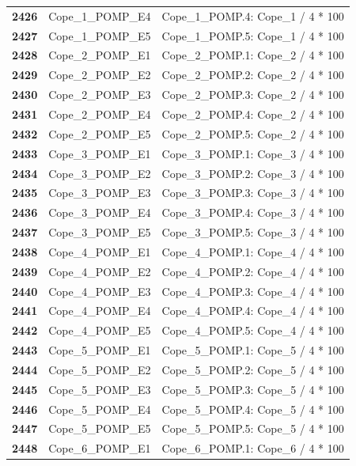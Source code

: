 \documentclass[
  letterpaper,
  DIV=11,
  numbers=noendperiod]{scrartcl}
\begin{document}
\begin{longtable}[t]{>{}cll}
\addlinespace
\textbf{2426} & Cope\_1\_POMP\_E4 & Cope\_1\_POMP.4: Cope\_1 / 4 * 100\\
\textbf{2427} & Cope\_1\_POMP\_E5 & Cope\_1\_POMP.5: Cope\_1 / 4 * 100\\
\textbf{2428} & Cope\_2\_POMP\_E1 & Cope\_2\_POMP.1: Cope\_2 / 4 * 100\\
\textbf{2429} & Cope\_2\_POMP\_E2 & Cope\_2\_POMP.2: Cope\_2 / 4 * 100\\
\textbf{2430} & Cope\_2\_POMP\_E3 & Cope\_2\_POMP.3: Cope\_2 / 4 * 100\\
\addlinespace
\textbf{2431} & Cope\_2\_POMP\_E4 & Cope\_2\_POMP.4: Cope\_2 / 4 * 100\\
\textbf{2432} & Cope\_2\_POMP\_E5 & Cope\_2\_POMP.5: Cope\_2 / 4 * 100\\
\textbf{2433} & Cope\_3\_POMP\_E1 & Cope\_3\_POMP.1: Cope\_3 / 4 * 100\\
\textbf{2434} & Cope\_3\_POMP\_E2 & Cope\_3\_POMP.2: Cope\_3 / 4 * 100\\
\textbf{2435} & Cope\_3\_POMP\_E3 & Cope\_3\_POMP.3: Cope\_3 / 4 * 100\\
\addlinespace
\textbf{2436} & Cope\_3\_POMP\_E4 & Cope\_3\_POMP.4: Cope\_3 / 4 * 100\\
\textbf{2437} & Cope\_3\_POMP\_E5 & Cope\_3\_POMP.5: Cope\_3 / 4 * 100\\
\textbf{2438} & Cope\_4\_POMP\_E1 & Cope\_4\_POMP.1: Cope\_4 / 4 * 100\\
\textbf{2439} & Cope\_4\_POMP\_E2 & Cope\_4\_POMP.2: Cope\_4 / 4 * 100\\
\textbf{2440} & Cope\_4\_POMP\_E3 & Cope\_4\_POMP.3: Cope\_4 / 4 * 100\\
\addlinespace
\textbf{2441} & Cope\_4\_POMP\_E4 & Cope\_4\_POMP.4: Cope\_4 / 4 * 100\\
\textbf{2442} & Cope\_4\_POMP\_E5 & Cope\_4\_POMP.5: Cope\_4 / 4 * 100\\
\textbf{2443} & Cope\_5\_POMP\_E1 & Cope\_5\_POMP.1: Cope\_5 / 4 * 100\\
\textbf{2444} & Cope\_5\_POMP\_E2 & Cope\_5\_POMP.2: Cope\_5 / 4 * 100\\
\textbf{2445} & Cope\_5\_POMP\_E3 & Cope\_5\_POMP.3: Cope\_5 / 4 * 100\\
\addlinespace
\textbf{2446} & Cope\_5\_POMP\_E4 & Cope\_5\_POMP.4: Cope\_5 / 4 * 100\\
\textbf{2447} & Cope\_5\_POMP\_E5 & Cope\_5\_POMP.5: Cope\_5 / 4 * 100\\
\textbf{2448} & Cope\_6\_POMP\_E1 & Cope\_6\_POMP.1: Cope\_6 / 4 * 100\\

\end{longtable}
\end{document}
